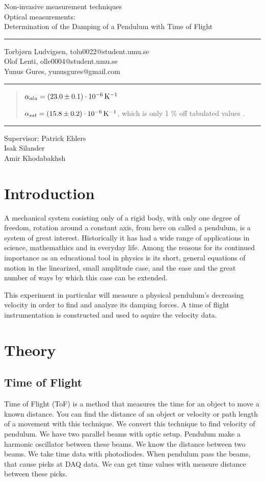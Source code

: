 \documentclass[11pt, a4paper]{article}
\date{\todayswe}
\makeatletter
\def\contacts{Torbjørn Ludvigsen, tolu0022@student.umu.se\\Olof Lenti, olle0004@student.umu.se\\
Yunus Gures, yunusgures@gmail.com}
\def\course{Non-invasive measurement techniques}
\def\lab{Optical measurements:\\Determination of the Damping of a Pendulum with Time of Flight}
\def\supervisors{Patrick Ehlers\\Isak Silander\\ Amir Khodabakhsh}
\makeatother
\begin{document}
\pagestyle{fancy}
\begin{titlepage}
	\begin{center}
		\course\\
		\Large{\lab}\vspace{2mm}
		\hrule\vspace{2mm}
		\tiny{\contacts}\vspace{2mm}
		\hrule
	\end{center}
	\vspace{4mm}

	\begin{abstract}

  $\alpha_{alu} =\unit[(23.0 \pm 0.1)\cdot10^{-6}]{K^{-1}}$ 

  $\alpha_{sst} = \unit[(15.8 \pm 0.2)\cdot10^{-6}]{K^{-1}}$, 
    which is only 1 \% off tabulated values \cite{ph, thex}.

	\end{abstract}
	\vfill
	\hrule\vspace{2mm}
	\centering
		\tiny{Supervisor: \supervisors}
\end{titlepage}

\pagestyle{plain}
\vspace{2cm}
\section{Introduction}
A mechanical system cosisting only of a rigid body, with only one degree of 
freedom, rotation around a constant axis, from here on called a pendulum, is 
a system of great interest. Historically it has had a wide range of
applications in science, mathemathics and in everyday life. Among the reasons for
its continued importance as an educational tool in physics is its short, general 
equations of
motion in the linearized, small amplitude case, and the ease and the great number 
of ways by which this case can be extended.

This experiment in particular will measure a physical pendulum's decreasing velocity
in order to find and analyze its damping forces. A time of flight instrumentation
is constructed and used to aquire the velocity data.

\section{Theory}
\subsection{Time of Flight}
Time of Flight (ToF) is a method that measures the time for an object to move a known distance.
You can find the distance of an object or velocity or path length of a movement with this technique.
We convert this technique to find velocity of pendulum. We have two parallel beams 
with optic setup. Pendulum make a harmonic oscillator between these beams. We know the 
distance between two beams. We take time data with photodiodes. When pendulum pass the 
beams, that cause picks at DAQ data. We can get time values with measure distance between 
these picks.
\end{document}
